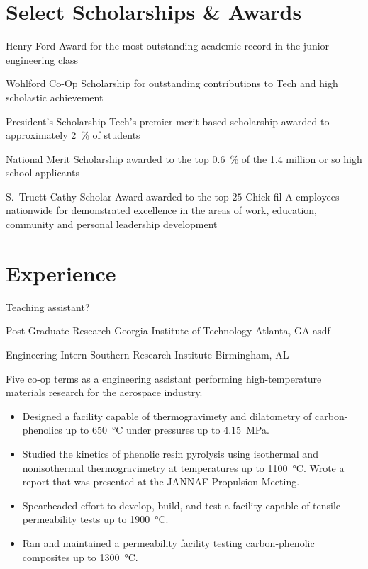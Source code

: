 \documentclass[10pt,letterpaper,roman]{moderncv}   %
\newcommand\cvdesc[2]{%
  \cventry{}%
  {#1}%
  {}%
  {\small #2}%
  {}%
  {}%
}
\begin{document}
\section{Select Scholarships \& Awards}
  \cvdesc{Henry Ford Award}{for the most outstanding academic record
    in the junior engineering class}
  \cvdesc{Wohlford Co-Op Scholarship}{for outstanding contributions to
    Tech and high scholastic achievement}
  \cvdesc{President's Scholarship}{Tech's premier merit-based
    scholarship awarded to approximately \SI{2}{\percent} of students}
  \cvdesc{National Merit Scholarship}{awarded to the top
    \SI{0.6}{\percent} of the \num{1.4} million or so high school
    applicants}
  \cvdesc{S.\ Truett Cathy Scholar Award}{awarded to the top $25$
    Chick-fil-A employees nationwide for demonstrated excellence in
    the areas of work, education, community and personal leadership
    development}

\section{Experience}

  {Teaching assistant?}
  {}
  {}
  {}
  {}

  {Post-Graduate Research}
  {Georgia Institute of Technology}
  {Atlanta, GA}
  {}
  {%
    asdf
  }

\let\labelitemi\labelitemii
{}
  {Engineering Intern}
  {Southern Research Institute}
  {Birmingham, AL}
  {}
  {%
    Five co-op terms as a engineering assistant performing
    high-temperature materials research for the aerospace industry.
    \begin{itemize}%
      \item Designed a facility capable of thermogravimety and
        dilatometry of carbon-phenolics up to \SI{650}{\celsius} under
        pressures up to \SI{4.15}{\mega\pascal}.
      \item Studied the kinetics of phenolic resin pyrolysis using
        isothermal and nonisothermal thermogravimetry at temperatures
        up to \SI{1100}{\celsius}. Wrote a report that was presented
        at the  JANNAF Propulsion Meeting.
      \item Spearheaded effort to develop, build, and test a facility
        capable of tensile permeability tests up to
        \SI{1900}{\celsius}.
      \item Ran and maintained a permeability facility testing
        carbon-phenolic composites up to \SI{1300}{\celsius}.
    \end{itemize}
  }
\end{document}
